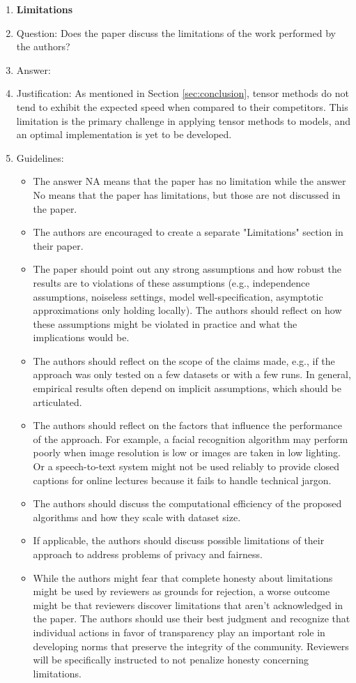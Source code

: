 \documentclass{article}
\begin{document}
\begin{enumerate}
\item {\bf Limitations}
    \item[] Question: Does the paper discuss the limitations of the work performed by the authors?
    \item[] Answer: \answerYes{} %
    \item[] Justification: As mentioned in Section \ref{sec:conclusion}, tensor methods do not tend to exhibit the expected speed when compared to their competitors. This limitation is the primary challenge in applying tensor methods to models, and an optimal implementation is yet to be developed.
    \item[] Guidelines:
    \begin{itemize}
        \item The answer NA means that the paper has no limitation while the answer No means that the paper has limitations, but those are not discussed in the paper. 
        \item The authors are encouraged to create a separate "Limitations" section in their paper.
        \item The paper should point out any strong assumptions and how robust the results are to violations of these assumptions (e.g., independence assumptions, noiseless settings, model well-specification, asymptotic approximations only holding locally). The authors should reflect on how these assumptions might be violated in practice and what the implications would be.
        \item The authors should reflect on the scope of the claims made, e.g., if the approach was only tested on a few datasets or with a few runs. In general, empirical results often depend on implicit assumptions, which should be articulated.
        \item The authors should reflect on the factors that influence the performance of the approach. For example, a facial recognition algorithm may perform poorly when image resolution is low or images are taken in low lighting. Or a speech-to-text system might not be used reliably to provide closed captions for online lectures because it fails to handle technical jargon.
        \item The authors should discuss the computational efficiency of the proposed algorithms and how they scale with dataset size.
        \item If applicable, the authors should discuss possible limitations of their approach to address problems of privacy and fairness.
        \item While the authors might fear that complete honesty about limitations might be used by reviewers as grounds for rejection, a worse outcome might be that reviewers discover limitations that aren't acknowledged in the paper. The authors should use their best judgment and recognize that individual actions in favor of transparency play an important role in developing norms that preserve the integrity of the community. Reviewers will be specifically instructed to not penalize honesty concerning limitations.
    \end{itemize}


\end{enumerate}
\end{document}
